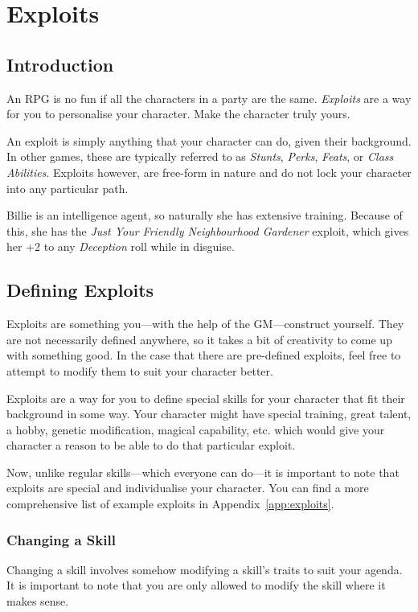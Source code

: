 \chapter{Exploits} \label{chap:exploits}
\section{Introduction}
An RPG is no fun if all the characters in a party are the same. 
\textit{Exploits} are a way for you to personalise your character. 
Make the character truly yours.

An exploit is simply anything that your character can do, given their background. In other games, these are typically referred to as \textit{Stunts}, \textit{Perks}, \textit{Feats}, or \textit{Class Abilities}.
Exploits however, are free-form in nature and do not lock your character into any particular path.

\example Billie is an intelligence agent, so naturally she has extensive training. 
Because of this, she has the \textit{Just Your Friendly Neighbourhood Gardener} exploit, which gives her +2 to any \textit{Deception} roll while in disguise.

\section{Defining Exploits}

Exploits are something you---with the help of the GM---construct yourself. 
They are not necessarily defined anywhere, so it takes a bit of creativity to come up with something good.
In the case that there are pre-defined exploits, feel free to attempt to modify them to suit your character better.

Exploits are a way for you to define special skills for your character that fit their background in some way. 
Your character might have special training, great talent, a hobby, genetic modification, magical capability, etc. which would give your character a reason to be able to do that particular exploit.

Now, unlike regular skills---which everyone can do---it is important to note that exploits are special and individualise your character.
You can find a more comprehensive list of example exploits in Appendix~\ref{app:exploits}.

\subsection{Changing a Skill}
Changing a skill involves somehow modifying a skill's traits to suit your agenda. 
It is important to note that you are only allowed to modify the skill where it makes sense. 
